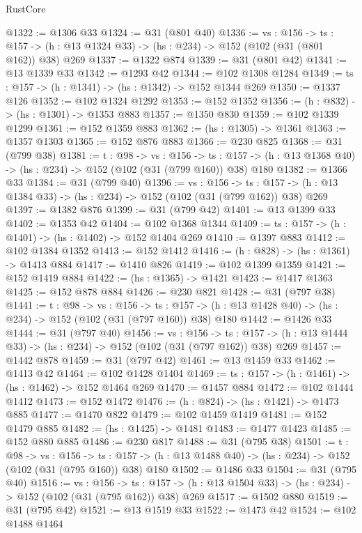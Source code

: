 \begin{lexlean}{RustCore}
\begin{coremodule}
@1322 := @1306 @33
@1324 := @31 (@801 @40)
@1336 := {vs : @156} ->
  {ts : @157} -> (h : @13 @1324 @33) -> (hs : @234) -> @152 (@102 (@31 (@801 @162)) @38) @269
@1337 := @1322 @874
@1339 := @31 (@801 @42)
@1341 := @13 @1339 @33
@1342 := @1293 @42
@1344 := @102 @1308 @1284
@1349 := {ts : @157} -> (h : @1341) -> (hs : @1342) -> @152 @1344 @269
@1350 := @1337 @126
@1352 := @102 @1324 @1292
@1353 := @152 @1352
@1356 := (h : @832) -> (hs : @1301) -> @1353 @883
@1357 := @1350 @830
@1359 := @102 @1339 @1299
@1361 := @152 @1359 @883
@1362 := (hs : @1305) -> @1361
@1363 := @1357 @1303
@1365 := @152 @876 @883
@1366 := @230 @825
@1368 := @31 (@799 @38)
@1381 := {t : @98} ->
  {vs : @156} ->
  {ts : @157} -> (h : @13 @1368 @40) -> (hs : @234) -> @152 (@102 (@31 (@799 @160)) @38) @180
@1382 := @1366 @33
@1384 := @31 (@799 @40)
@1396 := {vs : @156} ->
  {ts : @157} -> (h : @13 @1384 @33) -> (hs : @234) -> @152 (@102 (@31 (@799 @162)) @38) @269
@1397 := @1382 @876
@1399 := @31 (@799 @42)
@1401 := @13 @1399 @33
@1402 := @1353 @42
@1404 := @102 @1368 @1344
@1409 := {ts : @157} -> (h : @1401) -> (hs : @1402) -> @152 @1404 @269
@1410 := @1397 @883
@1412 := @102 @1384 @1352
@1413 := @152 @1412
@1416 := (h : @828) -> (hs : @1361) -> @1413 @884
@1417 := @1410 @826
@1419 := @102 @1399 @1359
@1421 := @152 @1419 @884
@1422 := (hs : @1365) -> @1421
@1423 := @1417 @1363
@1425 := @152 @878 @884
@1426 := @230 @821
@1428 := @31 (@797 @38)
@1441 := {t : @98} ->
  {vs : @156} ->
  {ts : @157} -> (h : @13 @1428 @40) -> (hs : @234) -> @152 (@102 (@31 (@797 @160)) @38) @180
@1442 := @1426 @33
@1444 := @31 (@797 @40)
@1456 := {vs : @156} ->
  {ts : @157} -> (h : @13 @1444 @33) -> (hs : @234) -> @152 (@102 (@31 (@797 @162)) @38) @269
@1457 := @1442 @878
@1459 := @31 (@797 @42)
@1461 := @13 @1459 @33
@1462 := @1413 @42
@1464 := @102 @1428 @1404
@1469 := {ts : @157} -> (h : @1461) -> (hs : @1462) -> @152 @1464 @269
@1470 := @1457 @884
@1472 := @102 @1444 @1412
@1473 := @152 @1472
@1476 := (h : @824) -> (hs : @1421) -> @1473 @885
@1477 := @1470 @822
@1479 := @102 @1459 @1419
@1481 := @152 @1479 @885
@1482 := (hs : @1425) -> @1481
@1483 := @1477 @1423
@1485 := @152 @880 @885
@1486 := @230 @817
@1488 := @31 (@795 @38)
@1501 := {t : @98} ->
  {vs : @156} ->
  {ts : @157} -> (h : @13 @1488 @40) -> (hs : @234) -> @152 (@102 (@31 (@795 @160)) @38) @180
@1502 := @1486 @33
@1504 := @31 (@795 @40)
@1516 := {vs : @156} ->
  {ts : @157} -> (h : @13 @1504 @33) -> (hs : @234) -> @152 (@102 (@31 (@795 @162)) @38) @269
@1517 := @1502 @880
@1519 := @31 (@795 @42)
@1521 := @13 @1519 @33
@1522 := @1473 @42
@1524 := @102 @1488 @1464

\end{coremodule}
\end{lexlean}
